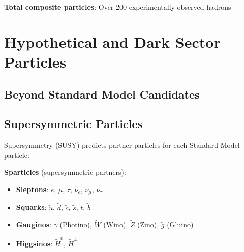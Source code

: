 	\textbf{Total composite particles}: Over 200 experimentally observed hadrons
	
	\section{Hypothetical and Dark Sector Particles}
	
	\subsection{Beyond Standard Model Candidates}
	
	\begin{table}[htbp]
		\centering
		\caption{Hypothetical Particles Beyond the Standard Model}
		\label{tab:hypothetical_particles}
	\end{table}
	
	\subsection{Supersymmetric Particles}
	
	Supersymmetry (SUSY) predicts partner particles for each Standard Model particle:
	
	\textbf{Sparticles} (supersymmetric partners):
	\begin{itemize}
		\item \textbf{Sleptons}: $\tilde{e}$, $\tilde{\mu}$, $\tilde{\tau}$, $\tilde{\nu}_e$, $\tilde{\nu}_\mu$, $\tilde{\nu}_\tau$
		\item \textbf{Squarks}: $\tilde{u}$, $\tilde{d}$, $\tilde{c}$, $\tilde{s}$, $\tilde{t}$, $\tilde{b}$
		\item \textbf{Gauginos}: $\tilde{\gamma}$ (Photino), $\tilde{W}$ (Wino), $\tilde{Z}$ (Zino), $\tilde{g}$ (Gluino)
		\item \textbf{Higgsinos}: $\tilde{H}^0$, $\tilde{H}^{\pm}$
	\end{itemize}
	
